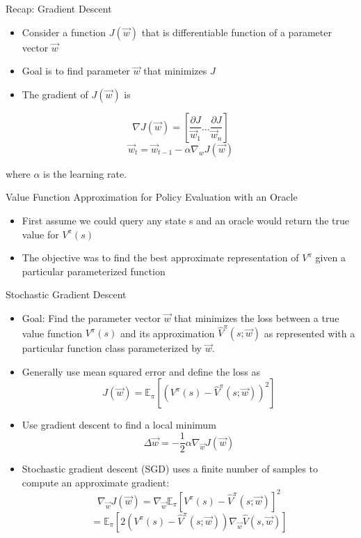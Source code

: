\begin{frame}[c]{Recap: Gradient Descent}
	
	
	\begin{itemize}
		\item Consider a function $J(\vec{w})$ that is differentiable function of a parameter vector $\vec{w}$
		\item Goal is to find parameter $\vec{w}$ that minimizes $J$
		\item The gradient of $J(\vec{w})$ is 
	\end{itemize}
	$$
	\nabla J(\vec{w}) = \left[ \frac{\partial J}{\vec{w}_1} \ldots \frac{\partial J}{\vec{w}_n} \right]
	$$
	$$\vec{w}_t = \vec{w}_{t-1} - \alpha \nabla_w J(\vec{w})$$
	
	where $\alpha$ is the learning rate.

	
\end{frame}
\begin{frame}[c]{Value Function Approximation for Policy Evaluation with
		an Oracle}
	
	
	\begin{itemize}
		\item First assume we could query any state s and an \alert{oracle} would return
		the true value for $V^\pi (s)$
		\item The objective was to find the best approximate representation of $V^\pi$
		given a particular parameterized function
	\end{itemize}
	
\end{frame}
\begin{frame}[c]{Stochastic Gradient Descent}
	
	
	\begin{itemize}
		\item Goal: Find the parameter vector $\vec{w}$ that minimizes the loss between a
		true value function $V^\pi(s)$ and its approximation $\hat{V}^\pi(s; \vec{w})$ as
		represented with a particular function class parameterized by $\vec{w}$.
		\item Generally use mean squared error and define the loss as 
		$$ J(\vec{w}) = \mathbb{E}_\pi [(V^\pi(s) - \hat{V}^\pi(s;\vec{w}))^2]$$
		\item Use gradient descent to find a local minimum 
		$$ \Delta \vec{w} = - \frac{1}{2} \alpha \nabla_\vec{w} J(\vec{w})$$
		\item Stochastic gradient descent (SGD) uses a finite number of samples to compute an approximate gradient:
		$$ \nabla_\vec{w} J(\vec{w}) = \nabla_{\vec{w}} \mathbb{E}_\pi[V^\pi (s) - \hat{V}^\pi (s; \vec{w})]^2$$
		$$= \mathbb{E}_\pi [2 (V^\pi(s) - \hat{V}^\pi (s;\vec{w})) \nabla_\vec{w} \hat{V}(s,\vec{w})]$$
	\end{itemize}
	
\end{frame}
